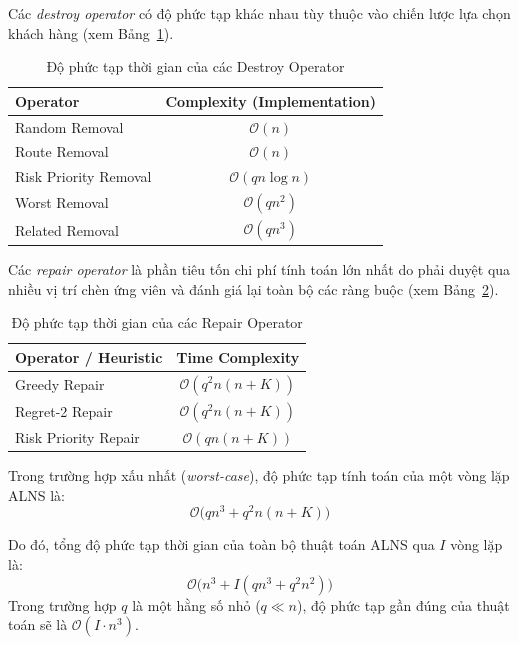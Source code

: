 \documentclass{article}
\begin{document}
Các \textit{destroy operator} có độ phức tạp khác nhau tùy thuộc vào chiến lược lựa chọn khách hàng (xem Bảng~\ref{tab:destroy_complexity}).

\begin{table}[htbp]
    \centering
    \caption{Độ phức tạp thời gian của các Destroy Operator}
    \label{tab:destroy_complexity}
    \begin{tabular}{|l|c|}
        \hline
        \textbf{Operator} & \textbf{Complexity (Implementation)} \\ \hline
        Random Removal & $\mathcal{O}(n)$ \\ \hline
        Route Removal & $\mathcal{O}(n)$ \\ \hline
        Risk Priority Removal & $\mathcal{O}(q n \log n)$ \\ \hline
        Worst Removal & $\mathcal{O}(q n^2)$ \\ \hline
        Related Removal & $\mathcal{O}(q n^3)$ \\ \hline
    \end{tabular}
\end{table}

Các \textit{repair operator} là phần tiêu tốn chi phí tính toán lớn nhất do phải duyệt qua nhiều vị trí chèn ứng viên và đánh giá lại toàn bộ các ràng buộc (xem Bảng~\ref{tab:repair_complexity}).

\begin{table}[htbp]
    \centering
    \caption{Độ phức tạp thời gian của các Repair Operator}
    \label{tab:repair_complexity}
    \begin{tabular}{|l|c|}
        \hline
        \textbf{Operator / Heuristic} & \textbf{Time Complexity} \\ \hline
        Greedy Repair & $\mathcal{O}(q^2 n(n + K))$ \\ \hline
        Regret-2 Repair & $\mathcal{O}(q^2 n(n + K))$ \\ \hline
        Risk Priority Repair & $\mathcal{O}(q n(n + K))$ \\ \hline
    \end{tabular}
\end{table}

Trong trường hợp xấu nhất (\textit{worst-case}), độ phức tạp tính toán của một vòng lặp ALNS là:
\begin{equation}
    \mathcal{O}\big(q n^3 + q^2 n (n + K)\big)
\end{equation}

Do đó, tổng độ phức tạp thời gian của toàn bộ thuật toán ALNS qua $I$ vòng lặp là:
\begin{equation}
    \mathcal{O}\big(n^3 + I (q n^3 + q^2 n^2)\big)
\end{equation}
Trong trường hợp $q$ là một hằng số nhỏ ($q \ll n$), độ phức tạp gần đúng của thuật toán sẽ là $\mathcal{O}(I \cdot n^3)$.
\end{document}
